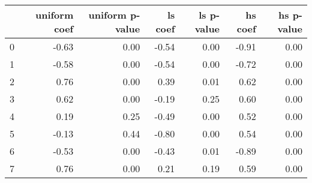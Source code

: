 \begin{tabular}{lrrrrrr}
\toprule
 & uniform coef & uniform p-value & ls coef & ls p-value & hs coef & hs p-value \\
\midrule
0 & -0.63 & 0.00 & -0.54 & 0.00 & -0.91 & 0.00 \\
1 & -0.58 & 0.00 & -0.54 & 0.00 & -0.72 & 0.00 \\
2 & 0.76 & 0.00 & 0.39 & 0.01 & 0.62 & 0.00 \\
3 & 0.62 & 0.00 & -0.19 & 0.25 & 0.60 & 0.00 \\
4 & 0.19 & 0.25 & -0.49 & 0.00 & 0.52 & 0.00 \\
5 & -0.13 & 0.44 & -0.80 & 0.00 & 0.54 & 0.00 \\
6 & -0.53 & 0.00 & -0.43 & 0.01 & -0.89 & 0.00 \\
7 & 0.76 & 0.00 & 0.21 & 0.19 & 0.59 & 0.00 \\
\bottomrule
\end{tabular}
